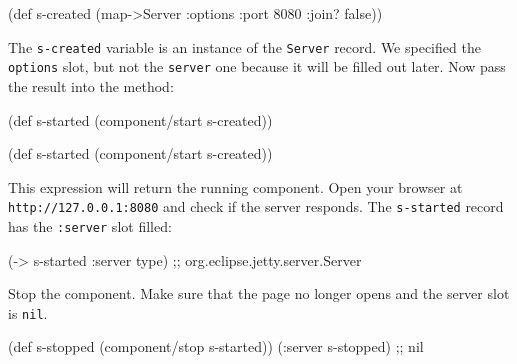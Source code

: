 \else

\begin{english}
  \begin{clojure}
(def s-created
  (map->Server {:options {:port 8080 :join? false}}))
  \end{clojure}
\end{english}

\fi

The \verb|s-created| variable is an instance of the \verb|Server| record. We specified the \verb|options| slot, but not the \verb|server| one because it will be filled out later. Now pass the result into the  method:

\ifnarrow

\begin{english}
  \begin{clojure}
(def s-started
  (component/start s-created))
  \end{clojure}
\end{english}

\else

\begin{english}
  \begin{clojure}
(def s-started (component/start s-created))
  \end{clojure}
\end{english}

\fi

This expression will return the running component. Open your browser at \texttt{http://127.0.0.1\-:8080} and check if the server responds. The \verb|s-started| record has the \verb|:server| slot filled:

\begin{english}
  \begin{clojure}
(-> s-started :server type)
;; org.eclipse.jetty.server.Server
  \end{clojure}
\end{english}

Stop the component. Make sure that the page no longer opens and the server slot is \verb|nil|.

\ifnarrow

\begin{english}
  \begin{clojure}
(def s-stopped
  (component/stop s-started))
(:server s-stopped) ;; nil
  \end{clojure}
\end{english}

\else

